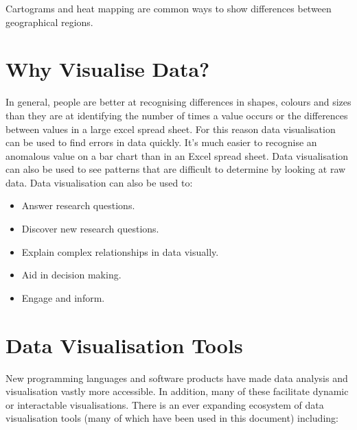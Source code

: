 \documentclass[
]{book}
\providecommand{\tightlist}{%
  \setlength{\itemsep}{0pt}\setlength{\parskip}{0pt}}
\begin{document}
Cartograms and heat mapping are common ways to show differences between geographical regions.

\hypertarget{why-visualise-data}{%
\section{Why Visualise Data?}\label{why-visualise-data}}

In general, people are better at recognising differences in shapes, colours and sizes than they are at identifying the number of times a value occurs or the differences between values in a large excel spread sheet. For this reason data visualisation can be used to find errors in data quickly. It's much easier to recognise an anomalous value on a bar chart than in an Excel spread sheet. Data visualisation can also be used to see patterns that are difficult to determine by looking at raw data.
Data visualisation can also be used to:

\begin{itemize}
\tightlist
\item
  Answer research questions.
\item
  Discover new research questions.
\item
  Explain complex relationships in data visually.
\item
  Aid in decision making.
\item
  Engage and inform.
\end{itemize}

\hypertarget{data-visualisation-tools}{%
\section{Data Visualisation Tools}\label{data-visualisation-tools}}

New programming languages and software products have made data analysis and visualisation vastly more accessible. In addition, many of these facilitate dynamic or interactable visualisations. There is an ever expanding ecosystem of data visualisation tools (many of which have been used in this document) including:
\end{document}
